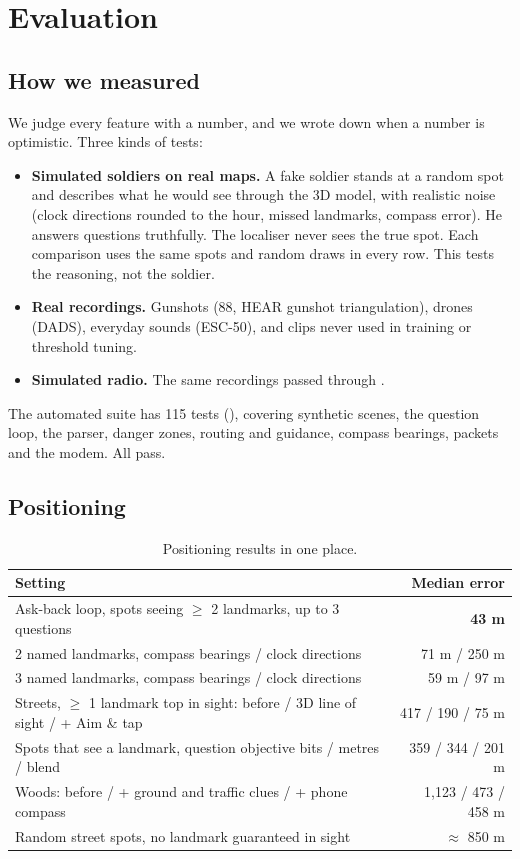 \chapter{Evaluation}\label{ch:eval}

\section{How we measured}

We judge every feature with a number, and we wrote down when a number is optimistic. Three kinds of tests:
\begin{itemize}
  \item \textbf{Simulated soldiers on real maps.} A fake soldier stands at a random spot and describes what he would
        see through the 3D model, with realistic noise (clock directions rounded to the hour, missed landmarks,
        compass error). He answers questions truthfully. The localiser never sees the true spot. Each comparison uses
        the same spots and random draws in every row. This tests the reasoning, not the soldier.
  \item \textbf{Real recordings.} Gunshots (88, HEAR gunshot triangulation), drones (DADS), everyday sounds (ESC-50), and
        clips never used in training or threshold tuning.
  \item \textbf{Simulated radio.} The same recordings passed through .
\end{itemize}
The automated suite has 115 tests (), covering synthetic scenes, the question loop, the parser, danger
zones, routing and guidance, compass bearings, packets and the modem. All pass.

\section{Positioning}

\begin{table}[htbp]\centering\small
\caption{Positioning results in one place.}\label{tab:posall}
\begin{tabularx}{\linewidth}{Xr}
\toprule
Setting & Median error\\
\midrule
Ask-back loop, spots seeing $\geq$ 2 landmarks, up to 3 questions & \textbf{43 m}\\
2 named landmarks, compass bearings / clock directions & 71 m / 250 m\\
3 named landmarks, compass bearings / clock directions & 59 m / 97 m\\
Streets, $\geq$ 1 landmark top in sight: before / 3D line of sight / + Aim \& tap & 417 / 190 / 75 m\\
Spots that see a landmark, question objective bits / metres / blend & 359 / 344 / 201 m\\
Woods: before / + ground and traffic clues / + phone compass & 1,123 / 473 / 458 m\\
Random street spots, no landmark guaranteed in sight & $\approx$ 850 m\\
\bottomrule
\end{tabularx}
\end{table}

